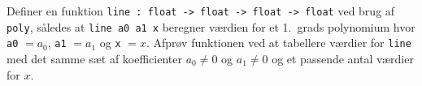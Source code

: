 \label{line} Definer en funktion \lstinline{line : float -> float -> float -> float} ved brug af \lstinline{poly}, således at \lstinline{line a0 a1 x} beregner værdien for et 1.\ grads polynomium hvor \lstinline{a0} $=a_0$, \lstinline{a1} $=a_1$ og \lstinline{x} $=x$. Afprøv funktionen ved at tabellere værdier for \lstinline{line} med det samme sæt af koefficienter $a_0\neq 0$ og $a_1\neq 0$ og et passende antal værdier for $x$.
